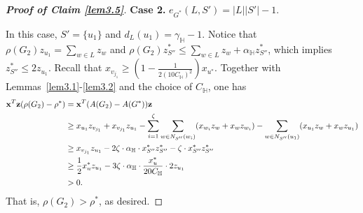 \documentclass[10pt,a4paper]{amsart}
\begin{document}
\begin{proof}[\bf Proof of Claim \ref{lem3.5}]
{\bf Case 2.} $e_{G^*}(L,S')=|L||S'|-1$.

In this case, $S'=\{u_1\}$ and $d_L(u_1)=\gamma_\mathbb{H}-1$. 
    Notice that $\rho(G_2)z_{u_1}=\sum_{w\in L}z_w$ and $\rho(G_2)z_{S''}^*\leq\sum_{w\in L}z_w+\alpha_\mathbb{H}z_{S''}^*$, %
    which implies $z_{S''}^*\leq 2z_{u_1}$. Recall that $x_{v_{j_1}} \geq \left(1-\frac{1}{2(10C_\mathbb{H})^{2}}\right)x_{u^{*}}$.  Together with Lemmas~\ref{lem3.1}-\ref{lem3.2} and the choice of $C_\mathbb{H}$, one has
    \begin{align*}
        {\bf x}^T{\bf z}(\rho(G_2)-\rho^*)&={\bf x}^T(A(G_2)-A(G^*)){\bf z} \\&\geq x_{u_1}z_{v_{j_1}}+x_{v_{j_1}}z_{u_1}-\sum_{i=1}^{\zeta}\sum_{w\in N_{S''}(w_i)}(x_{w_i}z_w+x_wz_{w_i})-\sum_{w\in N_{S''}(u_1)}(x_{u_1}z_w+x_wz_{u_1})\\ &\geq x_{v_{j_1}}z_{u_1}-2\zeta\cdot \alpha_\mathbb{H}\cdot x_{S''}^*z_{S''}^*-\zeta \cdot x_{S''}^*z_{S''}^*\\ &\geq \frac{1}{2}x_u^*z_{u_1}-3\zeta\cdot  \alpha_\mathbb{H}\cdot\frac{x_u^*}{20C_\mathbb{H}}\cdot2z_{u_1}\\ &>0.
    \end{align*}
That is, $\rho(G_2)>\rho^*$, as desired. 
\end{proof}
\end{document}
